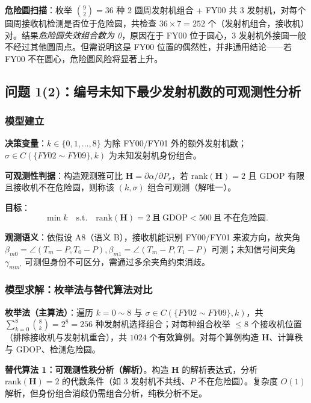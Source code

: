 \documentclass[12pt,a4paper]{ctexart}
\begin{document}
\textbf{危险圆扫描}：枚举 $\binom{9}{2}=36$ 种 2 圆周发射机组合 + FY00 共 3 发射机，对每个圆周接收机检测是否位于危险圆，共检查 $36\times 7=252$ 个（发射机组合，接收机）对。结果\emph{危险圆失效组合数为 0}，原因在于 FY00 位于圆心，3 发射机外接圆一般不经过其他圆周点。但需说明这是 FY00 位置的偶然性，并非通用结论——若 FY00 不在圆心，危险圆风险将显著上升。

\subsection{问题 1(2)：编号未知下最少发射机数的可观测性分析}

\subsubsection{模型建立}

\textbf{决策变量}：$k\in\{0,1,\dots,8\}$ 为除 FY00/FY01 外的额外发射机数；$\sigma\in C(\{FY02\sim FY09\},k)$ 为未知发射机身份组合。

\textbf{可观测性判据}：构造观测雅可比 $\mathbf{H}=\partial\alpha/\partial P_r$，若 $\text{rank}(\mathbf{H})=2$ 且 GDOP 有限且接收机不在危险圆，则称该 $(k,\sigma)$ 组合可观测（解唯一）。

\textbf{目标}：
\begin{equation}
\min k\quad\text{s.t.}\quad \text{rank}(\mathbf{H})=2\ \text{且}\ \text{GDOP}<500\ \text{且}\ \text{不在危险圆}.
\label{eq:q12-obj}
\end{equation}

\textbf{观测语义}：依假设 A8（语义 B），接收机能识别 FY00/FY01 来波方向，故夹角 $\beta_{m0}=\angle(T_m-P,T_0-P),\beta_{m1}=\angle(T_m-P,T_1-P)$ 可测；未知信号间夹角 $\gamma_{mm'}$ 可测但身份不可区分，需通过多余夹角约束消歧。

\subsubsection{模型求解：枚举法与替代算法对比}

\textbf{枚举法（主算法）}：遍历 $k=0\sim 8$ 与 $\sigma\in C(\{FY02\sim FY09\},k)$，共 $\sum_{k=0}^{8}\binom{8}{k}=2^8=256$ 种发射机选择组合；对每种组合枚举 $\le 8$ 个接收机位置（排除接收机与发射机重合），共 $1024$ 个有效算例。对每个算例构造 $\mathbf{H}$、计算秩与 GDOP、检测危险圆。

\textbf{替代算法 1：可观测性秩分析（解析）}。构造 $\mathbf{H}$ 的解析表达式，分析 $\text{rank}(\mathbf{H})=2$ 的代数条件（如 3 发射机不共线、$P$ 不在危险圆）。复杂度 $O(1)$ 解析，但身份组合消歧仍需组合分析，纯秩分析不足。
\end{document}
